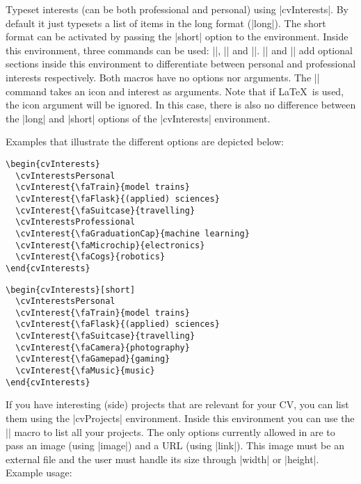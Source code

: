 \documentclass{ltxdoc}
\begin{document}
   Typeset interests (can be both professional and personal) using |cvInterests|. By default it just typesets a list of items in the long format (|long|). The short format can be activated by passing the |short| option to the environment. Inside this environment, three commands can be used: |\cvInterestsPersonal|, |\cvInterestsProfessional| and |\cvInterest|. \DescribeMacro{\cvInterestsPersonal} |\cvInterestsPersonal| and \DescribeMacro{\cvInterestsProfessional} |\cvInterestsProfessional| add optional sections inside this environment to differentiate between personal and professional interests respectively. Both macros have no options nor arguments. The \DescribeMacro{\cvInterest} || command takes an icon and interest as arguments. Note that if \LaTeX\ is used, the icon argument will be ignored. In this case, there is also no difference between the |long| and |short| options of the |cvInterests| environment.
  
  Examples that illustrate the different options are depicted below:

  \begin{lstlisting}
\begin{cvInterests}
  \cvInterestsPersonal
  \cvInterest{\faTrain}{model trains}
  \cvInterest{\faFlask}{(applied) sciences}
  \cvInterest{\faSuitcase}{travelling}
  \cvInterestsProfessional
  \cvInterest{\faGraduationCap}{machine learning}
  \cvInterest{\faMicrochip}{electronics}
  \cvInterest{\faCogs}{robotics}
\end{cvInterests}
  \end{lstlisting}
  
  \begin{lstlisting}
\begin{cvInterests}[short]
  \cvInterestsPersonal
  \cvInterest{\faTrain}{model trains}
  \cvInterest{\faFlask}{(applied) sciences}
  \cvInterest{\faSuitcase}{travelling}
  \cvInterest{\faCamera}{photography}
  \cvInterest{\faGamepad}{gaming}
  \cvInterest{\faMusic}{music}
\end{cvInterests}
  \end{lstlisting}
  
   If you have interesting (side) projects that are relevant for your CV, you can list them using the |cvProjects| environment. Inside this environment you can use the \DescribeMacro{\cvProject} || macro to list all your projects. The only options currently allowed in  are to pass an image (using |image|) and a URL (using |link|). This image must be an external file and the user must handle its size through |width| or |height|. Example usage:
  
\end{document}
